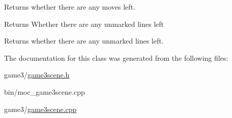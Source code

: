 \-Returns whether there are any moves left. 

\begin{DoxyReturn}{\-Returns}
\-Whether there are any unmarked lines left
\end{DoxyReturn}
\-Returns whether there are any unmarked lines left. 

\-The documentation for this class was generated from the following files\-:\begin{DoxyCompactItemize}
\item 
game3/\hyperlink{game3scene_8h}{game3scene.\-h}\item 
bin/moc\-\_\-game3scene.\-cpp\item 
game3/\hyperlink{game3scene_8cpp}{game3scene.\-cpp}\end{DoxyCompactItemize}
